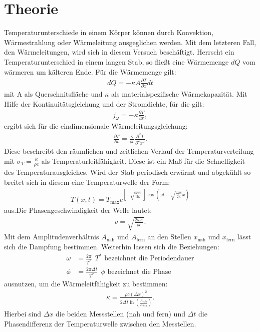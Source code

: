 \section{Theorie}
\label{sec:Theorie}
Temperaturunterschiede in einem Körper können durch Konvektion, Wärmestrahlung oder Wärmeleitung ausgeglichen werden.
Mit dem letzteren Fall, den Wärmeleitungen, wird sich in diesem Versuch beschäftigt.
Herrscht ein Temperaturunterschied in einem langen Stab, so fließt eine Wärmemenge $dQ$ vom wärmeren um kälteren Ende.
Für die Wärmemenge gilt:
\begin{align}
  dQ=-\kappa A\frac{\partial T}{\partial x}dt \label{eqn:dq}
\end{align}
mit A als Querschnitsfläche und $\kappa$ als materialspezifische Wärmekapazität.
Mit Hilfe der Kontinuitätsgleichung und der Stromdichte, für die gilt:
\begin{align}
  j_\omega=-\kappa\frac{\partial T}{\partial x},
\end{align}
ergibt sich für die eindimensionale Wärmeleitungsgleichung:
\begin{align}
  \frac{\partial T}{\partial t}=\frac{\kappa}{\rho c} \frac{\partial^2 T}{\partial^2 x^2}\label{eqn:wärmeleitungsgleichung}.
\end{align}
Diese beschreibt den räumlichen und zeitlichen Verlauf der Temperaturverteilung mit $\sigma_T=\frac{\kappa}{\rho c}$ als
Temperaturleitfähigkeit. Diese ist ein Maß für die Schnelligkeit des Temperaturausgleiches.
Wird der Stab periodisch erwärmt und abgekühlt so breitet sich in diesem eine Temperaturwelle der Form:
\begin{align}
  T(x,t)=T_\mathrm{max} e^{\left[-\sqrt{\frac{\omega\rho c}{2\kappa}} \ \right]\cos\left(\omega t-\sqrt{\frac{\omega\rho c}{2\kappa}} x\right)}
\end{align}
aus.Die Phasengeschwindigkeit der Welle lautet:
\begin{align}
  v=\sqrt{\frac{2\omega\kappa}{\rho c}}.
\end{align}
Mit dem Amplitudenverhältnis $A_\mathrm{nah}$ und $A_\mathrm{fern}$ an den Stellen $x_\mathrm{nah}$ und $x_\mathrm{fern}$
lässt sich die Dampfung bestimmen. Weiterhin lassen sich die Beziehungen:
\begin{align}
  \omega&=\frac{2\pi}{T^{*}} \ \ \text{$T^{*}$ bezeichnet die Periodendauer} \\
  \phi&=\frac{2\pi\Delta t}{T^{*}} \ \ \text{$\phi$ bezeichnet die Phase}
\end{align}
ausnutzen, um die Wärmeleitfähigkeit zu bestimmen:
\begin{align}
  \kappa=\frac{\rho c(\Delta x)^2}{2\Delta t \ln{\left(\frac{A_\mathrm{nah}}{A_\mathrm{fern}}\right)}} \label{eqn:k}.
\end{align}
Hierbei sind $\Delta x$ die beiden Messstellen (nah und fern) und $\Delta t$ die Phasendifferenz der Temperaturwelle zwischen den Messtellen.
